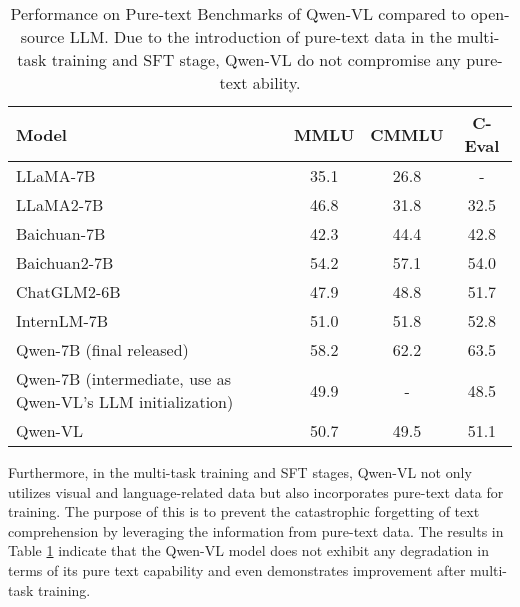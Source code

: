 \documentclass{article}
\newcommand{\tablestyle}[2]{\setlength{\tabcolsep}{#1}\renewcommand{\arraystretch}{#2}\centering\footnotesize}
\begin{document}
\begin{table}[ht]
\centering
\caption{Performance on Pure-text Benchmarks of Qwen-VL compared to open-source LLM. Due to the introduction of pure-text data in the multi-task training and SFT stage, Qwen-VL do not compromise any pure-text ability.}
\tablestyle{7pt}{1.3}
\begin{tabular}{@{}l|ccc@{}}
\toprule
Model & MMLU & CMMLU & C-Eval \\ \midrule
LLaMA-7B & 35.1 & 26.8 & - \\
LLaMA2-7B & 46.8 & 31.8 & 32.5 \\
Baichuan-7B & 42.3 & 44.4 & 42.8 \\
Baichuan2-7B & 54.2 & 57.1 & 54.0 \\
ChatGLM2-6B & 47.9 & 48.8 & 51.7 \\
InternLM-7B & 51.0 & 51.8 & 52.8 \\ 
Qwen-7B (final released) & 58.2 & 62.2 & 63.5 \\ \midrule
Qwen-7B (intermediate, use as Qwen-VL's LLM initialization) & 49.9 & - & 48.5 \\
Qwen-VL & 50.7 & 49.5 & 51.1 \\ \bottomrule
\end{tabular}
\label{tab:pure_text}
\end{table}

Furthermore, in the multi-task training and SFT stages, Qwen-VL not only utilizes visual and language-related data but also incorporates pure-text data for training. The purpose of this is to prevent the catastrophic forgetting of text comprehension by leveraging the information from pure-text data. The results in Table \ref{tab:pure_text} indicate that the Qwen-VL model does not exhibit any degradation in terms of its pure text capability and even demonstrates improvement after multi-task training.
\end{document}
